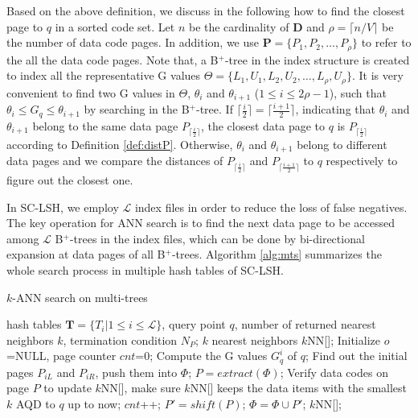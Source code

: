 \documentclass[twocolumn]{svjour3}          %
\begin{document}
Based on the above definition, we discuss in the following how to find the closest page to $q$ in a sorted code set. Let $n$ be the cardinality of $\textbf{D}$ and $\rho = \lceil n/V \rceil$ be the number of data code pages. In addition, we use $\textbf{P} = \{P_1, P_2, \dots, P_{\rho}\}$ to refer to the all the data code pages. Note that, a B$^+$-tree in the index structure is created to index all the representative G values $\Theta = \{L_1, U_1, L_2, U_2, \dots, L_{\rho}, U_{\rho}\}$. It is very convenient to find two G values in $\Theta$, $\theta_i$ and $\theta_{i+1}$ ($1 \leq i \leq 2\rho-1$), such that $\theta_i \leq G_q \leq \theta_{i+1}$ by searching in the B$^+$-tree. If $\lceil \frac{i}{2} \rceil = \lceil \frac{i+1}{2} \rceil$, indicating that $\theta_{i}$ and $\theta_{i+1}$ belong to the same data page $P_{\lceil \frac{i}{2} \rceil}$, the closest data page to $q$ is $P_{\lceil \frac{i}{2} \rceil}$ according to Definition \ref{def:distP}. Otherwise, $\theta_{i}$ and $\theta_{i+1}$ belong to different data pages and we compare the distances of $P_{\lceil \frac{i}{2} \rceil}$ and $P_{\lceil \frac{i+1}{2} \rceil}$ to $q$ respectively to figure out the closest one.

In SC-LSH, we employ $\mathcal{L}$ index files in order to reduce the loss of false negatives. The key operation for ANN search is to find the next data page to be accessed among $\mathcal{L}$ B$^+$-trees in the index files, which can be done by bi-directional expansion at data pages of all B$^+$-trees. Algorithm \ref{alg:mts} summarizes the whole search process in multiple hash tables of SC-LSH.
\begin{algorithm}[t]
\caption{$k$-ANN search on multi-trees}
\label{alg:mts}
\begin{algorithmic}[1]
\REQUIRE hash tables $\textbf{T}=\{T_{i}|1 \leq i \leq \mathcal{L}\}$, query point $q$, number of returned nearest neighbors $k$, termination condition $N_{P}$;
\ENSURE $k$ nearest neighbors $k$NN[];
\STATE Initialize $o$=NULL, page counter $cnt$=0;
\STATE Compute the G values $G_{q}^i$ of $q$;
\STATE Find out the initial pages $P_{iL}$ and $P_{iR}$, push them into $\Phi$;
\ENDFOR
\REPEAT
\STATE $P = extract(\Phi)$;
\STATE Verify data codes on page $P$ to update $k$NN[], make sure $k$NN[] keeps the data items with the smallest $k$ AQD to $q$ up to now;
\STATE $cnt$++;
\STATE $P' = shift(P)$;
\STATE $\Phi = \Phi \cup P'$;
\RETURN $k$NN[];
\end{algorithmic}
\end{algorithm}
\end{document}
